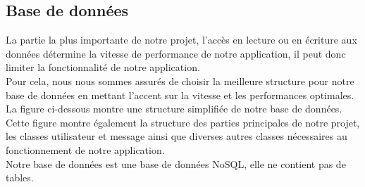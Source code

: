 \documentclass[french]{report}
\begin{document}
\subsection{\LARGE Base de données}
\LARGE La partie la plus importante de notre projet, l'accès en lecture ou en écriture aux données détermine la vitesse de performance de notre application, il peut donc limiter la fonctionnalité de notre application.\\
Pour cela, nous nous sommes assurés de choisir la meilleure structure pour notre base de données en mettant l'accent sur la vitesse et les performances optimales.\\
La figure ci-dessous montre une structure simplifiée de notre base de données.
Cette figure montre également la structure des parties principales de notre projet, les classes utilisateur et message ainsi que diverses autres classes nécessaires au fonctionnement de notre application.\\
Notre base de données est une base de données NoSQL, elle ne contient pas de tables.
\end{document}
